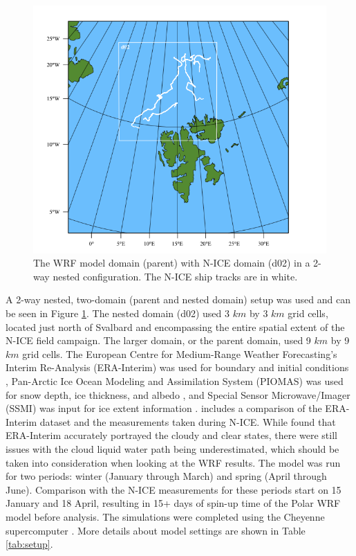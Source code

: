 \begin{figure}[h]
    \centering
    \includegraphics[width=1\linewidth]{figures/chapter3/wrf_domain.png}
    \caption[WRF Model Domain]{The WRF model domain (parent) with N-ICE domain (d02) in a 2-way nested configuration. The N-ICE ship tracks are in white.}
    \label{fig:wrf_domain}
\end{figure}

A 2-way nested, two-domain (parent and nested domain) setup was used and can be seen in Figure \ref{fig:wrf_domain}. The nested domain (d02) used 3 $km$ by 3 $km$ grid cells, located just north of Svalbard and encompassing the entire spatial extent of the N-ICE field campaign. The larger domain, or the parent domain, used 9 $km$ by 9 $km$ grid cells. The European Centre for Medium-Range Weather Forecasting’s Interim Re-Analysis (ERA-Interim) was used for boundary and initial conditions \citep{dee:2011}, Pan-Arctic Ice Ocean Modeling and Assimilation System (PIOMAS) was used for snow depth, ice thickness, and albedo \citep{PIOMASS}, and Special Sensor Microwave/Imager (SSMI) was input for ice extent information \citep{SSMI, schweiger:2011}. \citet{graham:2017} includes a comparison of the ERA-Interim dataset and the measurements taken during N-ICE. While \citet{graham:2017} found that ERA-Interim accurately portrayed the cloudy and clear states, there were still issues with the cloud liquid water path being underestimated, which should be taken into consideration when looking at the WRF results. The model was run for two periods: winter (January through March) and spring (April through June). Comparison with the N-ICE measurements for these periods start on 15 January and 18 April, resulting in 15+ days of spin-up time of the Polar WRF model before analysis. The simulations were completed using the Cheyenne supercomputer \citep{cheyenne}. More details about model settings are shown in Table \ref{tab:setup}. 

